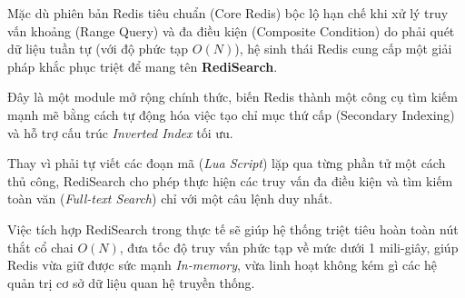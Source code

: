 Mặc dù phiên bản Redis tiêu chuẩn (Core Redis) bộc lộ hạn chế khi xử lý truy vấn khoảng (Range Query) và đa điều kiện (Composite Condition) do phải quét dữ liệu tuần tự (với độ phức tạp $O(N)$), hệ sinh thái Redis cung cấp một giải pháp khắc phục triệt để mang tên \textbf{RediSearch}. 

Đây là một module mở rộng chính thức, biến Redis thành một công cụ tìm kiếm mạnh mẽ bằng cách tự động hóa việc tạo chỉ mục thứ cấp (Secondary Indexing) và hỗ trợ cấu trúc \textit{Inverted Index} tối ưu. 

Thay vì phải tự viết các đoạn mã (\textit{Lua Script}) lặp qua từng phần tử một cách thủ công, RediSearch cho phép thực hiện các truy vấn đa điều kiện và tìm kiếm toàn văn (\textit{Full-text Search}) chỉ với một câu lệnh duy nhất. 

Việc tích hợp RediSearch trong thực tế sẽ giúp hệ thống triệt tiêu hoàn toàn nút thắt cổ chai $O(N)$, đưa tốc độ truy vấn phức tạp về mức dưới 1 mili-giây, giúp Redis vừa giữ được sức mạnh \textit{In-memory}, vừa linh hoạt không kém gì các hệ quản trị cơ sở dữ liệu quan hệ truyền thống.



